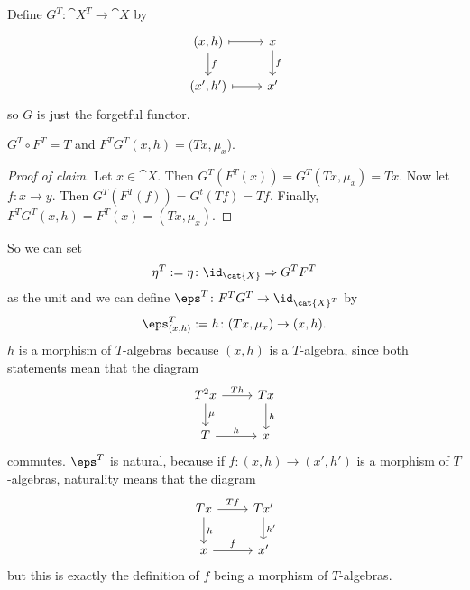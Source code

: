 \begin{beweis}
Define $G^T \colon \cat{X^T} \to \cat{X}$ by
\[
    \begin{tikzcd}
        (x,h) \arrow[r,mapsto] \arrow[d,"f"] 
          & x \arrow[d,"f"] \\
        (x',h') \arrow[r,mapsto]
          & x'
    \end{tikzcd}   
\]
so $G$ is just the forgetful functor.
\begin{claim*}
    $G^T \circ F^T = T$ and $F^TG^T(x,h) = (Tx,\mu_x$).
\end{claim*}
\begin{proof}[Proof of claim]
    Let $x \in \cat{X}.$ Then $G^T(F^T(x)) = G^T(Tx,\mu_x) = Tx.$
    Now let $f \colon x \to y$. Then $G^T(F^T(f))=G^t(Tf)=Tf.$
    Finally, $F^TG^T(x,h) = F^T(x) = (Tx,\mu_x).$
\end{proof}
So we can set 
\[
  \eta^T := \eta \colon \id_{\cat{X}} \Rightarrow G^TF^T 
\]
as the unit and we can define $\eps^T \colon F^TG^T \to \id_{\cat{X}^T}$ by
\[
    \eps^T_{(x,h)} := h \colon (Tx,\mu_x) \to (x,h).
\]
$h$ is a morphism of $T$-algebras because $(x,h)$ is a $T$-algebra, since both statements
mean that the diagram 
\[
    \begin{tikzcd}
        T^2x \arrow[r,"Th"] \arrow[d,"\mu"] 
          & Tx \arrow[d,"h"] \\
        T \arrow[r,"h"]
          & x
    \end{tikzcd}
\]
commutes. $\eps^T$ is natural, because if $f \colon (x,h) \to (x',h')$
is a morphism of $T$-algebras, naturality means that the diagram
\[
    \begin{tikzcd}
        Tx \arrow[r,"Tf"] \arrow[d,"h"]
          & Tx' \arrow[d,"h'"] \\
        x \arrow[r,"f"]
          & x'
    \end{tikzcd}
\]
but this is exactly the definition of $f$ being a morphism of $T$-algebras.
\end{beweis}
\begin{theorem}

\end{theorem}
